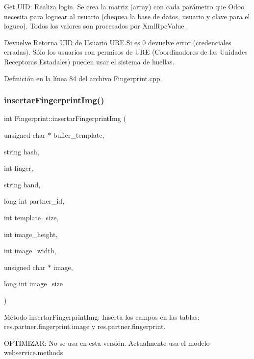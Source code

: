 Get U\+ID\+: Realiza login. Se crea la matriz (array) con cada parámetro que Odoo necesita para loguear al usuario (chequea la base de datos, usuario y clave para el logueo). Todos los valores son procesados por Xml\+Rpc\+Value. 

\begin{DoxyReturn}{Devuelve}
Retorna U\+ID de Usuario U\+R\+E.\+Si es 0 devuelve error (credenciales erradas). Sólo los usuarios con permisos de U\+RE (Coordinadores de las Unidades Receptoras Estadales) pueden usar el sistema de huellas. 
\end{DoxyReturn}


Definición en la línea 84 del archivo Fingerprint.\+cpp.

\hypertarget{classFingerprint_ad21765e70cee5626ca35007dc115e1e3}{}\label{classFingerprint_ad21765e70cee5626ca35007dc115e1e3} 
\subsubsection{\texorpdfstring{insertar\+Fingerprint\+Img()}{insertarFingerprintImg()}}
{\footnotesize\ttfamily int Fingerprint\+::insertar\+Fingerprint\+Img (\begin{DoxyParamCaption}\item[{unsigned char $\ast$}]{buffer\+\_\+template,  }\item[{string}]{hash,  }\item[{int}]{finger,  }\item[{string}]{hand,  }\item[{long int}]{partner\+\_\+id,  }\item[{int}]{template\+\_\+size,  }\item[{int}]{image\+\_\+height,  }\item[{int}]{image\+\_\+width,  }\item[{unsigned char $\ast$}]{image,  }\item[{long int}]{image\+\_\+size }\end{DoxyParamCaption})\hspace{0.3cm}{\ttfamily [inline]}}



Método insertar\+Fingerprint\+Img\+: Inserta los campos en las tablas\+: res.\+partner.\+fingerprint.\+image y res.\+partner.\+fingerprint. 

O\+P\+T\+I\+M\+I\+Z\+AR\+: No se usa en esta versión. Actualmente usa el modelo webservice.\+methods

